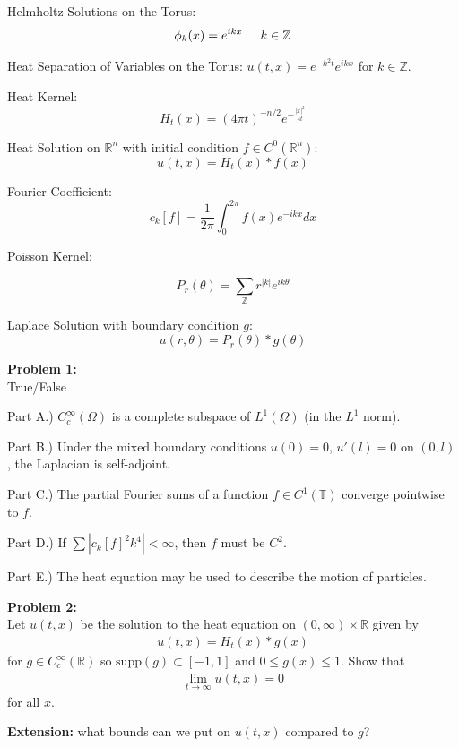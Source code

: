 \documentclass{article}
\newcommand{\Z}{{\mathbb{Z}}}
\newcommand{\R}{{\mathbb{R}}}
\begin{document}
Helmholtz Solutions on the Torus: $$\phi_{k}(x) = e^{ikx} \hspace{0.5 cm} k \in \Z$$

Heat Separation of Variables on the Torus: $u(t,x) = e^{-k^{2}t}e^{ikx}$ for $k \in \Z$. 


Heat Kernel:$$ H_{t}(x) = (4\pi t)^{-n/2} e^{-\frac{|x|^{2}}{4t}} $$

Heat Solution on $\R^{n}$ with initial condition $f \in C^{0}(\R^{n})$: $$u(t,x) = H_{t}(x) * f(x)$$

Fourier Coefficient: $$c_{k}[f] = \frac{1}{2\pi}\int_{0}^{2\pi} f(x) e^{-ikx} dx$$

Poisson Kernel: 

$$P_{r}(\theta) = \sum_{\Z} r^{|k|}e^{ik\theta}$$

Laplace Solution with boundary condition $g$:
$$u(r,\theta) = P_{r}(\theta)*g(\theta)$$




\newpage


\textbf{Problem 1:} \\

True/False

Part A.) $C_{c}^{\infty}(\Omega)$ is a complete subspace of $L^{1}(\Omega)$ (in the $L^{1}$ norm). 

Part B.) Under the mixed boundary conditions $u(0) = 0$, $u'(l) = 0$ on $(0,l)$, the Laplacian is self-adjoint. 

Part C.) The partial Fourier sums of a function $f \in C^{1}(\mathbb{T})$ converge pointwise to $f$. 

Part D.) If $\sum |c_{k}[f]^{2} k^{4}| < \infty$, then $f$ must be $C^{2}$.  

Part E.) The heat equation may be used to describe the motion of particles. 




\textbf{Problem 2:} \\

Let $u(t,x)$ be the solution to the heat equation on $(0,\infty) \times \R$ given by 
\begin{align*}
	u(t,x) = H_{t}(x) * g(x)
\end{align*}
for $g \in C_{c}^{\infty}(\R)$ so $\text{supp}(g) \subset [-1,1]$ and $ 0 \leq g(x) \leq 1$. Show that 
\begin{align*}
	\lim_{t \to \infty} u(t,x) = 0
\end{align*}
for all $x$.  

\textbf{Extension:} what bounds can we put on $u(t,x)$ compared to $g$?
\end{document}
